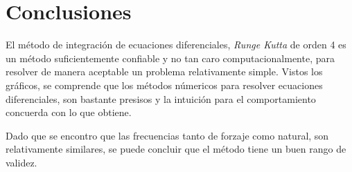 \documentclass[10pt]{article}
\begin{document}
\section{Conclusiones}

 El método de integración de ecuaciones diferenciales, \textit{Runge Kutta} de orden 4 es un método suficientemente confiable y no tan caro computacionalmente, para resolver de manera aceptable un problema relativamente simple. Vistos los gráficos, se comprende que los métodos númericos para resolver ecuaciones diferenciales, son bastante presisos y la intuición para el comportamiento concuerda con lo que obtiene.
 
 Dado que se encontro que las frecuencias tanto de forzaje como natural, son relativamente similares, se puede concluir que el método tiene un buen rango de validez. 
 
\end{document}
